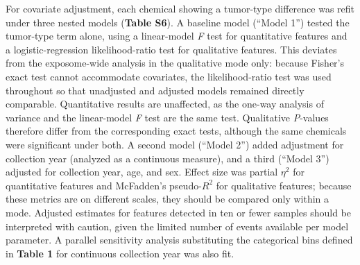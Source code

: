 \noindent For covariate adjustment, each chemical showing a tumor-type difference was refit under three nested models (\textbf{Table S6}). A baseline model (“Model 1”) tested the tumor-type term alone, using a linear-model \textit{F} test for quantitative features and a logistic-regression likelihood-ratio test for qualitative features. This deviates from the exposome-wide analysis in the qualitative mode only: because Fisher's exact test cannot accommodate covariates, the likelihood-ratio test was used throughout so that unadjusted and adjusted models remained directly comparable. Quantitative results are unaffected, as the one-way analysis of variance and the linear-model \textit{F} test are the same test. Qualitative \textit{P}-values therefore differ from the corresponding exact tests, although the same chemicals were significant under both. A second model (“Model 2”) added adjustment for collection year (analyzed as a continuous measure), and a third (“Model 3”) adjusted for collection year, age, and sex. Effect size was partial $\eta^{2}$ for quantitative features and McFadden's pseudo-$R^{2}$ for qualitative features; because these metrics are on different scales, they should be compared only within a mode. Adjusted estimates for features detected in ten or fewer samples should be interpreted with caution, given the limited number of events available per model parameter. A parallel sensitivity analysis substituting the categorical bins defined in \textbf{Table 1} for continuous collection year was also fit.
